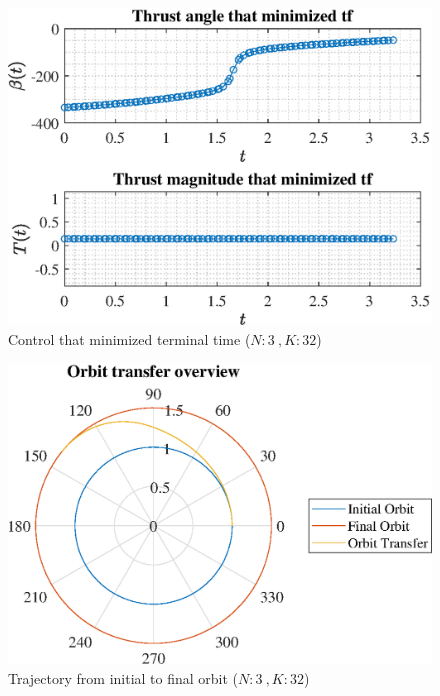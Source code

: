 \documentclass[]{article}
\begin{document}
	\begin{figure}
		\centering
		\includegraphics[scale=0.75]{control_N3_K32_C2_tf.eps}
		\caption{Control that minimized terminal time (\(N:3\ , K:32\))}
		\label{fig:control_N3_K32_C2_tf}
	\end{figure}
	\begin{figure}
		\centering
		\includegraphics[scale=0.75]{orbit_N3_K32_C2_tf.eps}
		\caption{Trajectory from initial to final orbit (\(N:3\ , K:32\))}
		\label{fig:orbit_N3_K32_C2_tf}
	\end{figure}
\end{document}
